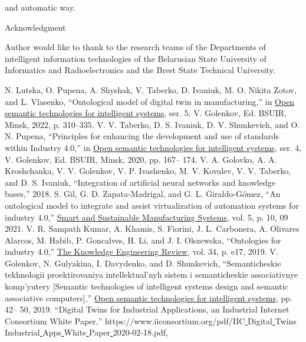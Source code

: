 \documentclass[7pt]{article} \twocolumn
\begin{document}
and automatic way. \\
\begin{center}
    Acknowledgment
\end{center}
\par Author would like to thank to the research teams of
the Departments of intelligent information technologies
of the Belarusian State University of Informatics and Radioelectronics and the Brest State Technical University.
\begin{center}
\begin{thebibliography}{20}
\fontsize{6}{5}\selectfont
\setlength{\parindent}{0cm}
\setlength{\parskip}{0.1cm}
  N. Lutska, O. Pupena, A. Shyshak, V. Taberko, D. Ivaniuk, M. O.
Nikita Zotov, and L. Vlasenko, “Ontological model of digital twin
in manufacturing,” in \underline{Open semantic technologies for intelligent
systems}, ser. 5, V. Golenkov, Ed. BSUIR, Minsk, 2022, p.
310–335.
 V. V. Taberko, D. S. Ivaniuk, D. V. Shunkevich, and O. N. Pupena,
“Principles for enhancing the development and use of standards
within Industry 4.0,” in \underline{Open semantic technologies for intelligent
systems}, ser. 4, V. Golenkov, Ed. BSUIR, Minsk, 2020, pp. 167–
174.
 V. A. Golovko, A. A. Kroshchanka, V. V. Golenkov, V. P.
Ivashenko, M. V. Kovalev, V. V. Taberko, and D. S. Ivaniuk,
“Integration of artificial neural networks and knowledge bases,”
2018.
 S. Gil, G. D. Zapata-Madrigal, and G. L. Giraldo-Gómez, “An ontological model to integrate and assist virtualization of automation
systems for industry 4.0,” \underline{Smart and Sustainable Manufacturing
Systems}, vol. 5, p. 10, 09 2021.
 V. R. Sampath Kumar, A. Khamis, S. Fiorini, J. L. Carbonera, A. Olivares Alarcos, M. Habib, P. Goncalves, H. Li, and
J. I. Olszewska, “Ontologies for industry 4.0,” \underline{The Knowledge
Engineering Review}, vol. 34, p. e17, 2019.
 V. Golenkov, N. Gulyakina, I. Davydenko, and
D. Shunkevich, “Semanticheskie tekhnologii proektirovaniya
intellektual’nyh sistem i semanticheskie associativnye
komp’yutery [Semantic technologies of intelligent
systems design and semantic associative computers],”
\underline{Open semantic technologies for intelligent systems}, pp. 42–
50, 2019.
 “Digital Twins for Industrial Applications, an Industrial Internet
Consortium White Paper,” https://www.iiconsortium.org/pdf/IIC\underline{ }
Digital\underline{ }Twins\underline{ }Industrial\underline{ }Apps\underline{ }White\underline{ }Paper\underline{ }2020-02-18.pdf,

\end{thebibliography}
\end{center}
\end{document}
